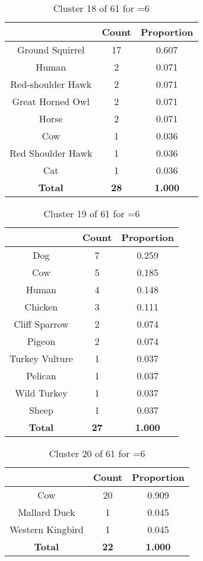 \begin{table}[ht!]
\centering
\begin{tabular}{|c|c|c|}
\hline
\bf \Spec{} &\bf Count &\bf Proportion\\ \hline \hline
Ground Squirrel & 17 & 0.607\\ \hline
Human & 2 & 0.071\\ \hline
Red-shoulder Hawk & 2 & 0.071\\ \hline
Great Horned Owl & 2 & 0.071\\ \hline
Horse & 2 & 0.071\\ \hline
Cow & 1 & 0.036\\ \hline
Red Shoulder Hawk & 1 & 0.036\\ \hline
Cat & 1 & 0.036\\ \hline
\hline
\bf Total & \bf 28 & \bf 1.000\\ \hline
\end{tabular}
\label{tab:cluster:18:6}
\caption{Cluster 18 of 61 for \minneigh{}=6}
\end{table}

\begin{table}[ht!]
\centering
\begin{tabular}{|c|c|c|}
\hline
\bf \Spec{} &\bf Count &\bf Proportion\\ \hline \hline
Dog & 7 & 0.259\\ \hline
Cow & 5 & 0.185\\ \hline
Human & 4 & 0.148\\ \hline
Chicken & 3 & 0.111\\ \hline
Cliff Sparrow & 2 & 0.074\\ \hline
Pigeon & 2 & 0.074\\ \hline
Turkey Vulture & 1 & 0.037\\ \hline
Pelican & 1 & 0.037\\ \hline
Wild Turkey & 1 & 0.037\\ \hline
Sheep & 1 & 0.037\\ \hline
\hline
\bf Total & \bf 27 & \bf 1.000\\ \hline
\end{tabular}
\label{tab:cluster:19:6}
\caption{Cluster 19 of 61 for \minneigh{}=6}
\end{table}

\clearpage
\begin{table}[ht!]
\centering
\begin{tabular}{|c|c|c|}
\hline
\bf \Spec{} &\bf Count &\bf Proportion\\ \hline \hline
Cow & 20 & 0.909\\ \hline
Mallard Duck & 1 & 0.045\\ \hline
Western Kingbird & 1 & 0.045\\ \hline
\hline
\bf Total & \bf 22 & \bf 1.000\\ \hline
\end{tabular}
\label{tab:cluster:20:6}
\caption{Cluster 20 of 61 for \minneigh{}=6}
\end{table}

